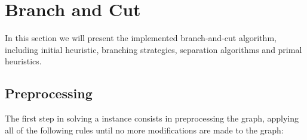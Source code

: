
\section{Branch and Cut}
\label{sec:bnc}

In this section we will present the implemented branch-and-cut algorithm, including initial heuristic, branching strategies, separation algorithms and primal heuristics.


\subsection{Preprocessing}

The first step in solving a \PCP{} instance consists in preprocessing the graph, applying all of the following rules until no more modifications are made to the graph:

